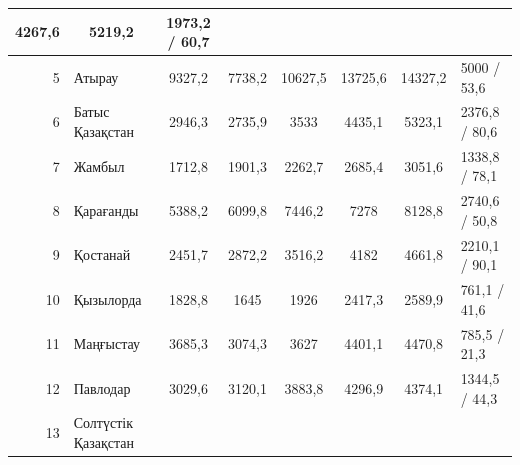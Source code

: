 \begin{table}[H]
{\begin{tabular}{|rlcccccl|}
    \multicolumn{1}{c|}{4267,6} &
    \multicolumn{1}{c|}{5219,2} &
    1973,2 / 60,7 \\ \hline
  \multicolumn{1}{|r|}{5} &
    \multicolumn{1}{l|}{Атырау} &
    \multicolumn{1}{c|}{9327,2} &
    \multicolumn{1}{c|}{7738,2} &
    \multicolumn{1}{c|}{10627,5} &
    \multicolumn{1}{c|}{13725,6} &
    \multicolumn{1}{c|}{14327,2} &
    5000 / 53,6 \\ \hline
  \multicolumn{1}{|r|}{6} &
    \multicolumn{1}{l|}{Батыс Қазақстан} &
    \multicolumn{1}{c|}{2946,3} &
    \multicolumn{1}{c|}{2735,9} &
    \multicolumn{1}{c|}{3533} &
    \multicolumn{1}{c|}{4435,1} &
    \multicolumn{1}{c|}{5323,1} &
    2376,8 / 80,6 \\ \hline
  \multicolumn{1}{|r|}{7} &
    \multicolumn{1}{l|}{Жамбыл} &
    \multicolumn{1}{c|}{1712,8} &
    \multicolumn{1}{c|}{1901,3} &
    \multicolumn{1}{c|}{2262,7} &
    \multicolumn{1}{c|}{2685,4} &
    \multicolumn{1}{c|}{3051,6} &
    1338,8 / 78,1 \\ \hline
  \multicolumn{1}{|r|}{8} &
    \multicolumn{1}{l|}{Қарағанды} &
    \multicolumn{1}{c|}{5388,2} &
    \multicolumn{1}{c|}{6099,8} &
    \multicolumn{1}{c|}{7446,2} &
    \multicolumn{1}{c|}{7278} &
    \multicolumn{1}{c|}{8128,8} &
    2740,6 / 50,8 \\ \hline
  \multicolumn{1}{|r|}{9} &
    \multicolumn{1}{l|}{Қостанай} &
    \multicolumn{1}{c|}{2451,7} &
    \multicolumn{1}{c|}{2872,2} &
    \multicolumn{1}{c|}{3516,2} &
    \multicolumn{1}{c|}{4182} &
    \multicolumn{1}{c|}{4661,8} &
    2210,1 / 90,1 \\ \hline
  \multicolumn{1}{|r|}{10} &
    \multicolumn{1}{l|}{Қызылорда} &
    \multicolumn{1}{c|}{1828,8} &
    \multicolumn{1}{c|}{1645} &
    \multicolumn{1}{c|}{1926} &
    \multicolumn{1}{c|}{2417,3} &
    \multicolumn{1}{c|}{2589,9} &
    761,1 / 41,6 \\ \hline
  \multicolumn{1}{|r|}{11} &
    \multicolumn{1}{l|}{Маңғыстау} &
    \multicolumn{1}{c|}{3685,3} &
    \multicolumn{1}{c|}{3074,3} &
    \multicolumn{1}{c|}{3627} &
    \multicolumn{1}{c|}{4401,1} &
    \multicolumn{1}{c|}{4470,8} &
    785,5 / 21,3 \\ \hline
  \multicolumn{1}{|r|}{12} &
    \multicolumn{1}{l|}{Павлодар} &
    \multicolumn{1}{c|}{3029,6} &
    \multicolumn{1}{c|}{3120,1} &
    \multicolumn{1}{c|}{3883,8} &
    \multicolumn{1}{c|}{4296,9} &
    \multicolumn{1}{c|}{4374,1} &
    1344,5 / 44,3 \\ \hline
  \multicolumn{1}{|r|}{13} &
    \multicolumn{1}{l|}{Солтүстік Қазақстан} &

\end{tabular}}
\end{table}
